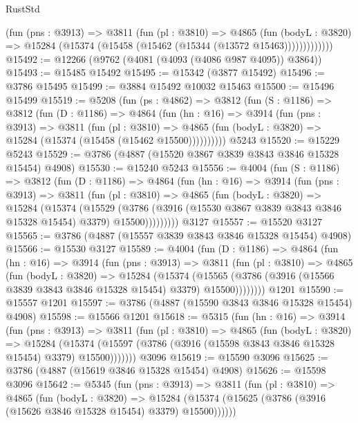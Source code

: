 \begin{lexlean}{RustStd}
\begin{coremodule}
              (fun (pns : @3913) =>
              @3811
                (fun (pl : @3810) =>
                @4865
                  (fun (bodyL : @3820) =>
                  @15284 (@15374 (@15458 (@15462 (@15344 (@13572 @15463)))))))))))))
@15492 := @12266 (@9762 (@4081 (@4093 (@4086 @987 @4095)) @3864))
@15493 := @15485 @15492
@15495 := @15342 (@3877 @15492)
@15496 := @3786 @15495
@15499 := @3884 @15492 @10032 @15463
@15500 := @15496 @15499
@15519 := @5208
    (fun (ps : @4862) =>
    @3812
      (fun (S : @1186) =>
      @3812
        (fun (D : @1186) =>
        @4864
          (fun (hn : @16) =>
          @3914
            (fun (pns : @3913) =>
            @3811
              (fun (pl : @3810) =>
              @4865 (fun (bodyL : @3820) => @15284 (@15374 (@15458 (@15462 @15500))))))))))
    @5243
@15520 := @15229 @5243
@15529 := @3786 (@4887 (@15520 @3867 @3839 @3843 @3846 @15328 @15454) @4908)
@15530 := @15240 @5243
@15556 := @4004
    (fun (S : @1186) =>
    @3812
      (fun (D : @1186) =>
      @4864
        (fun (hn : @16) =>
        @3914
          (fun (pns : @3913) =>
          @3811
            (fun (pl : @3810) =>
            @4865
              (fun (bodyL : @3820) =>
              @15284
                (@15374
                  (@15529
                    (@3786
                      (@3916 (@15530 @3867 @3839 @3843 @3846 @15328 @15454) @3379)
                      @15500)))))))))
    @3127
@15557 := @15520 @3127
@15565 := @3786 (@4887 (@15557 @3839 @3843 @3846 @15328 @15454) @4908)
@15566 := @15530 @3127
@15589 := @4004
    (fun (D : @1186) =>
    @4864
      (fun (hn : @16) =>
      @3914
        (fun (pns : @3913) =>
        @3811
          (fun (pl : @3810) =>
          @4865
            (fun (bodyL : @3820) =>
            @15284
              (@15374
                (@15565 (@3786 (@3916 (@15566 @3839 @3843 @3846 @15328 @15454) @3379) @15500))))))))
    @1201
@15590 := @15557 @1201
@15597 := @3786 (@4887 (@15590 @3843 @3846 @15328 @15454) @4908)
@15598 := @15566 @1201
@15618 := @5315
    (fun (hn : @16) =>
    @3914
      (fun (pns : @3913) =>
      @3811
        (fun (pl : @3810) =>
        @4865
          (fun (bodyL : @3820) =>
          @15284
            (@15374 (@15597 (@3786 (@3916 (@15598 @3843 @3846 @15328 @15454) @3379) @15500)))))))
    @3096
@15619 := @15590 @3096
@15625 := @3786 (@4887 (@15619 @3846 @15328 @15454) @4908)
@15626 := @15598 @3096
@15642 := @5345
    (fun (pns : @3913) =>
    @3811
      (fun (pl : @3810) =>
      @4865
        (fun (bodyL : @3820) =>
        @15284 (@15374 (@15625 (@3786 (@3916 (@15626 @3846 @15328 @15454) @3379) @15500))))))

\end{coremodule}
\end{lexlean}
